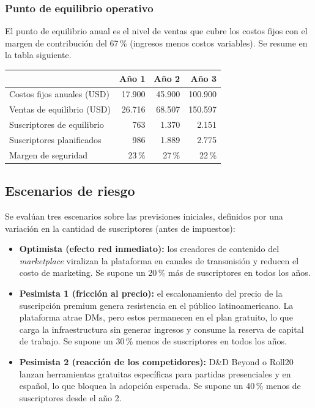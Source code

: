 \subsubsection{Punto de equilibrio operativo}
El punto de equilibrio anual es el nivel de ventas que cubre los costos fijos con el margen de contribución del 67\,\% (ingresos menos costos variables). Se resume en la tabla siguiente.

\begin{center}
\small
\begin{tabularx}{\textwidth}{|X|r|r|r|}
\hline
 & \textbf{Año 1} & \textbf{Año 2} & \textbf{Año 3}\\ \hline
Costos fijos anuales (USD) & 17.900 & 45.900 & 100.900\\ \hline
Ventas de equilibrio (USD) & 26.716 & 68.507 & 150.597\\ \hline
Suscriptores de equilibrio & 763 & 1.370 & 2.151\\ \hline
Suscriptores planificados & 986 & 1.889 & 2.775\\ \hline
Margen de seguridad & 23\,\% & 27\,\% & 22\,\%\\ \hline
\end{tabularx}
\end{center}

\subsection{Escenarios de riesgo}
Se evalúan tres escenarios sobre las previsiones iniciales, definidos por una variación en la cantidad de suscriptores (antes de impuestos):
\begin{itemize}
  \item \textbf{Optimista (efecto red inmediato):} los creadores de contenido del \textit{marketplace} viralizan la plataforma en canales de transmisión y reducen el costo de marketing. Se supone un 20\,\% más de suscriptores en todos los años.
  \item \textbf{Pesimista 1 (fricción al precio):} el escalonamiento del precio de la suscripción premium genera resistencia en el público latinoamericano. La plataforma atrae DMs, pero estos permanecen en el plan gratuito, lo que carga la infraestructura sin generar ingresos y consume la reserva de capital de trabajo. Se supone un 30\,\% menos de suscriptores en todos los años.
  \item \textbf{Pesimista 2 (reacción de los competidores):} D\&D Beyond o Roll20 lanzan herramientas gratuitas específicas para partidas presenciales y en español, lo que bloquea la adopción esperada. Se supone un 40\,\% menos de suscriptores desde el año 2.
\end{itemize}

